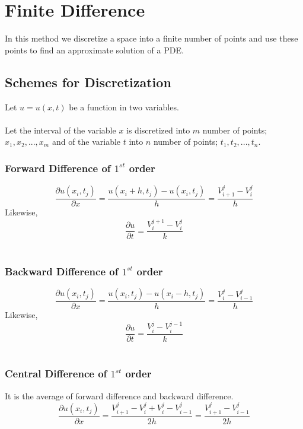 \documentclass[a4paper,14pt,twoside,onecolumn,openany,final]{memoir}
\begin{document}
 \clearpage

 \tableofcontents
\mainmatter
\chapter{Finite Difference}
In this method we discretize a space into a finite number of points and use these points to find an
approximate solution of a PDE.

 \section{Schemes for Discretization}
Let $u=u(x,t)$ be a function in two variables. \\ \\
Let the interval of the variable $x$ is discretized into $m$ number of points; $x_1,x_2,...,x_m$ and
of the variable $t$ into $n$ number of points; $t_1, t_2,...,t_n$. \\

 \subsection{Forward Difference of \(1^{st}\) order}
 \[\frac{{\partial u}(x_i,t_j)}{\partial x} = \frac{u(x_i+h,t_j)-u(x_i,t_j)}{h} =
 \frac{V_{i+1}^j - V_i^j}{h}\]
 Likewise,\\
 \[\frac{\partial u}{\partial t} = \frac{V_i^{j+1}-V_i^j}{k}\] \\

 \subsection{Backward Difference of \(1^{st}\) order}
 \[\frac{{\partial u}(x_i,t_j)}{\partial x} = \frac{u(x_i,t_j)-u(x_i-h,t_j)}{h} =
 \frac{V_i^j - V_{i-1}^j}{h}\]
 Likewise,\\
 \[\frac{\partial u}{\partial t} = \frac{V_i^j-V_i^{j-1}}{k}\]\\

 \subsection{Central Difference of \(1^{st}\) order}
 It is the average of forward difference and backward difference.\\
 \[\frac{{\partial u}(x_i,t_j)}{\partial x} = \frac{V_{i+1}^j - V_i^j + V_i^j - V_{i-1}^j}{2h} =
 \frac{V_{i+1}^j - V_{i-1}^j}{2h}\] \\
\end{document}
